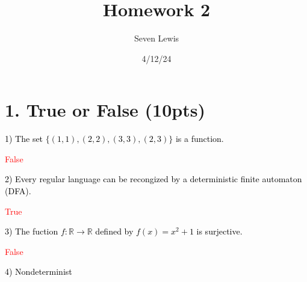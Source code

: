 \documentclass{article}
\title{Homework 2}
\author{Seven Lewis}
\date{4/12/24}
\newcommand{\problem}[1]{\noindent\textcolor{black}{#1}}
\newcommand{\solution}[1]{\noindent\textcolor{red}{#1}}
\begin{document}
\maketitle


\section*{1. True or False (10pts)}
\problem{1) The set $\{(1,1),(2,2),(3,3),(2,3)\}$ is a function.}

\solution{False}

\problem{2) Every regular language can be recongized by a deterministic finite automaton (DFA).}

\solution{True}

\problem{3) The fuction $f: \mathbb R \rightarrow \mathbb R$ defined by $f(x) = x^2 + 1$ is surjective.}

\solution{False}

\problem{4) Nondeterminist}
\end{document}
